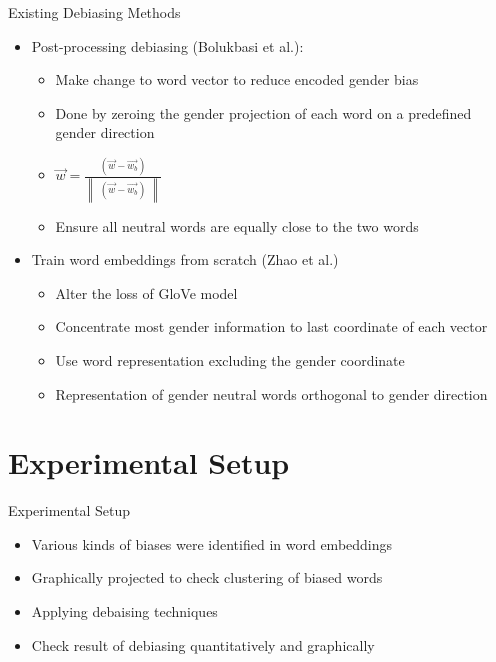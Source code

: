 \documentclass{beamer}
\begin{document}
		\begin{frame}{Existing Debiasing Methods}
			\begin{itemize}
				\item Post-processing debiasing (Bolukbasi et al.):
				\begin{itemize}
					\item Make change to word vector to reduce encoded gender bias
					\item Done by zeroing the gender projection of each word on a predefined gender direction
					 \item $\vec{w} = \frac{(\vec{w}-\vec{w_{b}})}{\begin{Vmatrix}(\vec{w}-\vec{w_{b}})\end{Vmatrix}}$
					 \item Ensure all neutral words are equally close to the two words
				\end{itemize}
			\item Train word embeddings from scratch (Zhao et al.)
			\begin{itemize}
				\item Alter the loss of GloVe model
				\item Concentrate most gender information to last coordinate of each vector
				\item Use word representation excluding the gender coordinate
				\item Representation of gender neutral words orthogonal to gender direction
			\end{itemize}
			\end{itemize}
		\end{frame}
	
	\section{Experimental Setup}
	\begin{frame}{Experimental Setup}
		\begin{itemize}
			\item Various kinds of biases were identified in word embeddings
			\item Graphically projected to check clustering of biased words
			\item Applying debaising techniques
			\item Check result of debiasing quantitatively and graphically
		\end{itemize}
	\end{frame}
	
\end{document}
